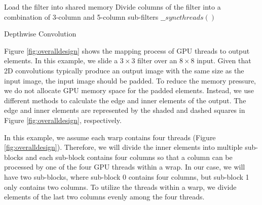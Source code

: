 \begin{algorithm}[t!]
\small
	Load the filter into shared memory\;
	Divide columns of the filter into a combination of 3-column and 5-column sub-filters\;
	$\_\_syncthreads()$\;
	\caption{Depthwise Convolution}
	\label{algo:overalldesign}
\end{algorithm}

Figure \ref{fig:overalldesign} shows the mapping process of GPU threads to output elements. In this example, we slide a $3 \times 3$ filter
over an $8 \times 8$ input.  Given that 2D convolutions typically produce an output image with the same size as the input image, the
input image should be padded. To reduce the memory pressure, we do not allocate GPU memory space for the padded elements. Instead,
we use different methods to calculate the edge and inner elements of the output. The edge and inner elements are represented by the shaded
and dashed squares in Figure \ref{fig:overalldesign}, respectively.


In this example, we assume each warp contains four threads (Figure \ref{fig:overalldesign}). Therefore, we will divide the inner elements
into multiple sub-blocks and each sub-block contains four columns so that a column can be processed by one of the four GPU threads within a
wrap. In our case, we will have two sub-blocks, where sub-block 0 contains four columns, but sub-block 1 only contains two columns. To
utilize the threads within a warp, we divide elements of the last two columns evenly among the four threads.

